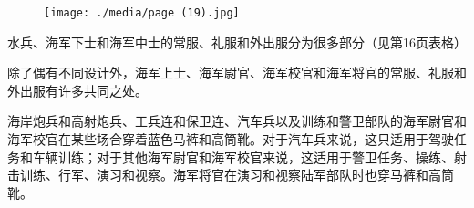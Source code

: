 \begin{figure}
\texttt{[image: ./media/page (19).jpg]}
\end{figure}

水兵、海军下士和海军中士的常服、礼服和外出服分为很多部分（见第16页表格）%

除了偶有不同设计外，海军上士、海军尉官、海军校官和海军将官的常服、礼服和外出服有许多共同之处。

海岸炮兵和高射炮兵、工兵连和保卫连、汽车兵以及训练和警卫部队的海军尉官和海军校官在某些场合穿着蓝色马裤和高筒靴。对于汽车兵来说，这只适用于驾驶任务和车辆训练；对于其他海军尉官和海军校官来说，这适用于警卫任务、操练、射击训练、行军、演习和视察。海军将官在演习和视察陆军部队时也穿马裤和高筒靴。
